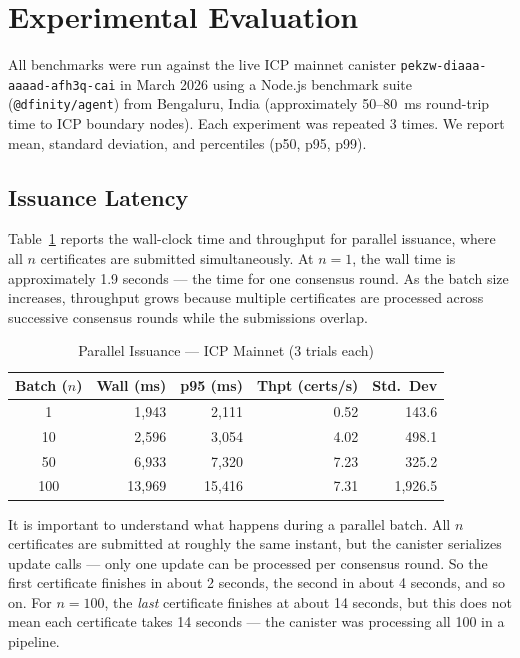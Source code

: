 \documentclass[conference]{IEEEtran}
\begin{document}
\section{Experimental Evaluation}
\label{sec:eval}

All benchmarks were run against the live ICP mainnet canister \texttt{pekzw-diaaa-aaaad-afh3q-cai} in March 2026 using a Node.js benchmark suite (\texttt{@dfinity/agent}) from Bengaluru, India (approximately 50--80~ms round-trip time to ICP boundary nodes). Each experiment was repeated 3 times. We report mean, standard deviation, and percentiles (p50, p95, p99).

\subsection{Issuance Latency}

Table~\ref{tab:issuance} reports the wall-clock time and throughput for parallel issuance, where all $n$ certificates are submitted simultaneously. At $n = 1$, the wall time is approximately 1.9 seconds — the time for one consensus round. As the batch size increases, throughput grows because multiple certificates are processed across successive consensus rounds while the submissions overlap.

\begin{table}[t]
\caption{Parallel Issuance --- ICP Mainnet (3 trials each)}
\label{tab:issuance}
\centering\small\renewcommand{\arraystretch}{1.1}
\begin{tabular}{@{}crrrr@{}}
\toprule
\textbf{Batch ($n$)} & \textbf{Wall (ms)} & \textbf{p95 (ms)} & \textbf{Thpt (certs/s)} & \textbf{Std.\ Dev} \\
\midrule
1   & 1{,}943  & 2{,}111  & 0.52 & 143.6 \\
10  & 2{,}596  & 3{,}054  & 4.02 & 498.1 \\
50  & 6{,}933  & 7{,}320  & 7.23 & 325.2 \\
100 & 13{,}969 & 15{,}416 & 7.31 & 1{,}926.5 \\
\bottomrule
\end{tabular}
\end{table}

It is important to understand what happens during a parallel batch. All $n$ certificates are submitted at roughly the same instant, but the canister serializes update calls — only one update can be processed per consensus round. So the first certificate finishes in about 2 seconds, the second in about 4 seconds, and so on. For $n = 100$, the \emph{last} certificate finishes at about 14 seconds, but this does not mean each certificate takes 14 seconds — the canister was processing all 100 in a pipeline.
\end{document}
